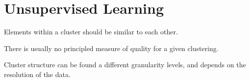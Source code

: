 
\section{Unsupervised Learning}

Elements within a cluster should be similar to each other.


There is usually no principled measure of quality
for a given clustering.

Cluster structure can be found a different granularity levels,
and depends on the resolution of the data.




